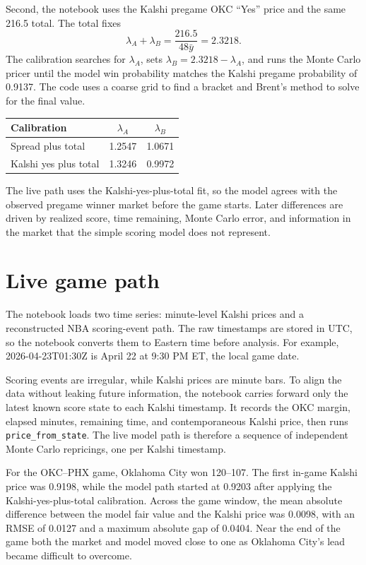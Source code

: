 \documentclass[10pt]{article}
\begin{document}
Second, the notebook uses the Kalshi pregame OKC ``Yes'' price and the same
216.5 total. The total fixes
\begin{equation}
    \lambda_A + \lambda_B
    =
    \frac{216.5}{48\bar y}
    =
    2.3218.
\end{equation}
The calibration searches for \(\lambda_A\), sets
\(\lambda_B=2.3218-\lambda_A\), and runs the Monte Carlo pricer until the
model win probability matches the Kalshi pregame probability of 0.9137. The
code uses a coarse grid to find a bracket and Brent's method to solve for the
final value.

\begin{center}
\begin{tabular}{lcc}
\toprule
Calibration & \(\lambda_A\) & \(\lambda_B\) \\
\midrule
Spread plus total & 1.2547 & 1.0671 \\
Kalshi yes plus total & 1.3246 & 0.9972 \\
\bottomrule
\end{tabular}
\end{center}

The live path uses the Kalshi-yes-plus-total fit, so the model agrees with the
observed pregame winner market before the game starts. Later differences are
driven by realized score, time remaining, Monte Carlo error, and information in
the market that the simple scoring model does not represent.

\section{Live game path}

The notebook loads two time series: minute-level Kalshi prices and a
reconstructed NBA scoring-event path. The raw timestamps are stored in UTC, so
the notebook converts them to Eastern time before analysis. For example,
2026-04-23T01:30Z is April 22 at 9:30 PM ET, the local game date.

Scoring events are irregular, while Kalshi prices are minute bars. To align the
data without leaking future information, the notebook carries forward only the
latest known score state to each Kalshi timestamp. It records the OKC margin,
elapsed minutes, remaining time, and contemporaneous Kalshi price, then runs
\texttt{price\_from\_state}. The live model path is therefore a sequence of
independent Monte Carlo repricings, one per Kalshi timestamp.

For the OKC--PHX game, Oklahoma City won 120--107. The first in-game Kalshi
price was 0.9198, while the model path started at 0.9203 after applying the
Kalshi-yes-plus-total calibration. Across the game window, the mean absolute
difference between the model fair value and the Kalshi price was 0.0098, with
an RMSE of 0.0127 and a maximum absolute gap of 0.0404. Near the end of the
game both the market and model moved close to one as Oklahoma City's lead
became difficult to overcome.
\end{document}
